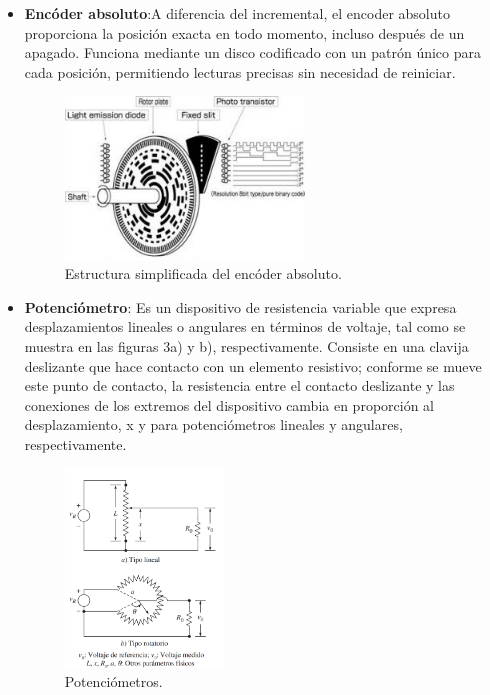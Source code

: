 \documentclass{article}
\begin{document}
\begin{itemize}
		
		\item \textbf{Encóder absoluto}:A diferencia del incremental, el encoder absoluto proporciona la posición exacta en todo momento, incluso después de un apagado. Funciona mediante un disco codificado con un patrón único para cada posición, permitiendo lecturas precisas sin necesidad de reiniciar.
		\begin{figure}[H]
			\centering
			\includegraphics[width=0.6\textwidth]{encoderabsoluto.jpg}
			\caption{Estructura simplificada del encóder absoluto.}
			\label{fig:encoderabsoluto}
		\end{figure}

		
		\item \textbf{Potenciómetro}: Es un dispositivo de resistencia variable que expresa desplazamientos lineales o angulares en términos de voltaje, tal como se muestra en las figuras 3a) y b), respectivamente. Consiste en una clavija deslizante que hace contacto con un elemento resistivo; conforme se mueve este punto de contacto, la resistencia entre el contacto deslizante y las conexiones de los extremos del dispositivo cambia en proporción al desplazamiento, x y  para potenciómetros lineales y angulares, respectivamente.
		\begin{figure}[H]
			\centering
			\includegraphics[width=0.4\textwidth]{potenciometro.png}
			\caption{Potenciómetros.}
			\label{fig:potenciometros}
		\end{figure}
		

\end{itemize}
\end{document}
